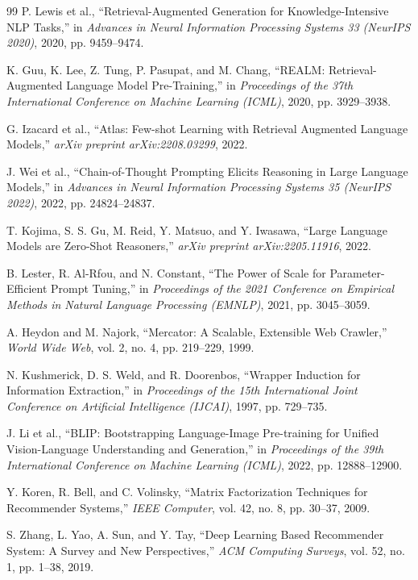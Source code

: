 \documentclass[conference]{IEEEtran}
\begin{document}
\begin{thebibliography}{99}
P. Lewis et al., ``Retrieval-Augmented Generation for Knowledge-Intensive NLP Tasks,'' in \textit{Advances in Neural Information Processing Systems 33 (NeurIPS 2020)}, 2020, pp. 9459--9474.

K. Guu, K. Lee, Z. Tung, P. Pasupat, and M. Chang, ``REALM: Retrieval-Augmented Language Model Pre-Training,'' in \textit{Proceedings of the 37th International Conference on Machine Learning (ICML)}, 2020, pp. 3929--3938.

G. Izacard et al., ``Atlas: Few-shot Learning with Retrieval Augmented Language Models,'' \textit{arXiv preprint arXiv:2208.03299}, 2022.

J. Wei et al., ``Chain-of-Thought Prompting Elicits Reasoning in Large Language Models,'' in \textit{Advances in Neural Information Processing Systems 35 (NeurIPS 2022)}, 2022, pp. 24824--24837.

T. Kojima, S. S. Gu, M. Reid, Y. Matsuo, and Y. Iwasawa, ``Large Language Models are Zero-Shot Reasoners,'' \textit{arXiv preprint arXiv:2205.11916}, 2022.

B. Lester, R. Al-Rfou, and N. Constant, ``The Power of Scale for Parameter-Efficient Prompt Tuning,'' in \textit{Proceedings of the 2021 Conference on Empirical Methods in Natural Language Processing (EMNLP)}, 2021, pp. 3045--3059.

A. Heydon and M. Najork, ``Mercator: A Scalable, Extensible Web Crawler,'' \textit{World Wide Web}, vol. 2, no. 4, pp. 219--229, 1999.

N. Kushmerick, D. S. Weld, and R. Doorenbos, ``Wrapper Induction for Information Extraction,'' in \textit{Proceedings of the 15th International Joint Conference on Artificial Intelligence (IJCAI)}, 1997, pp. 729--735.

J. Li et al., ``BLIP: Bootstrapping Language-Image Pre-training for Unified Vision-Language Understanding and Generation,'' in \textit{Proceedings of the 39th International Conference on Machine Learning (ICML)}, 2022, pp. 12888--12900.

Y. Koren, R. Bell, and C. Volinsky, ``Matrix Factorization Techniques for Recommender Systems,'' \textit{IEEE Computer}, vol. 42, no. 8, pp. 30--37, 2009.

S. Zhang, L. Yao, A. Sun, and Y. Tay, ``Deep Learning Based Recommender System: A Survey and New Perspectives,'' \textit{ACM Computing Surveys}, vol. 52, no. 1, pp. 1--38, 2019.


\end{thebibliography}
\end{document}
